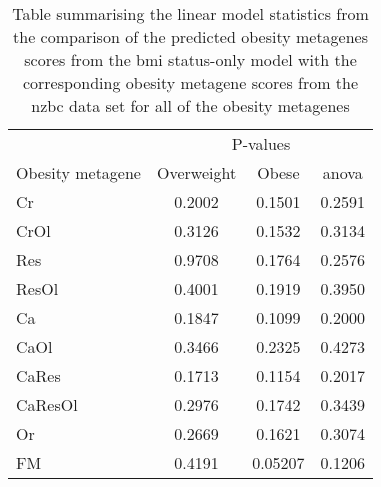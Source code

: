 	\begin{table}[htpb]
		\centering
		\caption[Summary of the statistics from the comparison of all the predicted obesity metagene scores from the \gls{bmi} status-only model with the corresponding obesity metagenes from the \gls{nzbc} data]{Table summarising the linear model statistics from the comparison of the predicted obesity metagenes scores from the \gls{bmi} status-only model with the corresponding obesity metagene scores from the \gls{nzbc} data set for all of the obesity metagenes}
		\label{tab:bmi_status_cris}
		\begin{tabular}{lccc}
			& \multicolumn{3}{c}{ P-values} \\
			\cmidrule(r){2-4}
			Obesity metagene & Overweight & Obese & \gls{anova} \\
			\hline
			\hline
			\rule{0pt}{2.25ex}Cr & 0.2002 & 0.1501  & 0.2591 \\
			CrOl                 & 0.3126 & 0.1532  & 0.3134 \\
			Res                  & 0.9708 & 0.1764  & 0.2576 \\
			ResOl                & 0.4001 & 0.1919  & 0.3950 \\
			Ca                   & 0.1847 & 0.1099  & 0.2000 \\
			CaOl                 & 0.3466 & 0.2325  & 0.4273 \\
			CaRes                & 0.1713 & 0.1154  & 0.2017 \\
			CaResOl              & 0.2976 & 0.1742  & 0.3439 \\
			Or                   & 0.2669 & 0.1621  & 0.3074 \\
			FM                   & 0.4191 & 0.05207 & 0.1206 \\
			\hline
			\hline
		\end{tabular}
	\end{table}


